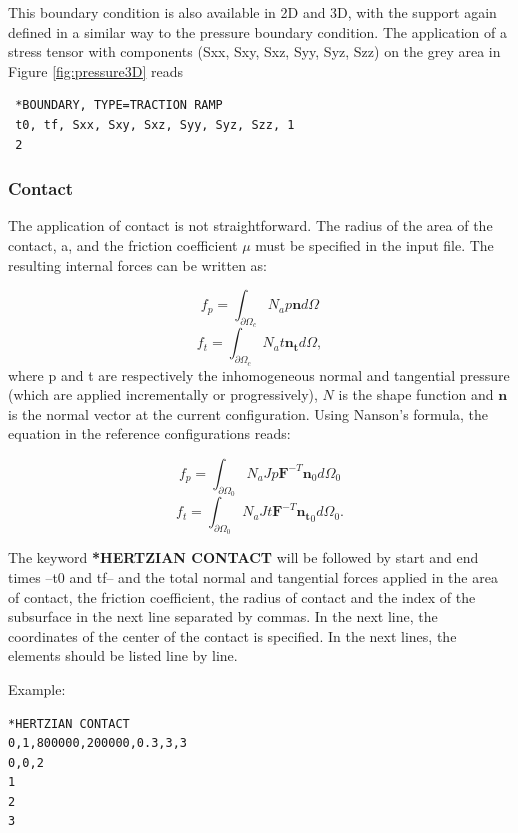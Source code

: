 \documentclass[oneside,11pt,times]{book}
\begin{document}
 This boundary condition is also available in 2D and 3D, with the support again defined in a similar way to the pressure boundary condition. The application of a stress tensor with components (Sxx, Sxy, Sxz, Syy, Syz, Szz) on the grey area in Figure \ref{fig:pressure3D} reads
 \begin{lstlisting}
 *BOUNDARY, TYPE=TRACTION RAMP
 t0, tf, Sxx, Sxy, Sxz, Syy, Syz, Szz, 1
 2
 \end{lstlisting}


 \subsubsection{Contact}

 The application of contact is not straightforward. The radius of the area of the contact, a, and the friction coefficient $\mu$ must be specified in the input file. The resulting internal forces can be written as:

 \begin{equation}
f_p=\int_{\partial\Omega_c}N_ap\mathbf{n}d\Omega
\end{equation}
 \begin{equation}
f_t=\int_{\partial\Omega_c}N_at\mathbf{n_{t}}d\Omega,
\end{equation}
where p and t are respectively the inhomogeneous normal and tangential pressure (which are applied incrementally or progressively), $N$ is the shape function and $\mathbf{n}$ is the normal vector at the current configuration. Using Nanson's formula, the equation in the reference configurations reads:

\begin{equation}
f_p=\int_{\partial\Omega_0}N_aJp\mathbf{F}^{-T}\mathbf{n}_0d\Omega_0
\end{equation}
\begin{equation}
f_t=\int_{\partial\Omega_0}N_aJt\mathbf{F}^{-T}\mathbf{n_{t}}_0d\Omega_0.
\end{equation}

The keyword \textbf{*HERTZIAN CONTACT} will be followed by start and end times --t0 and tf-- and the total normal and tangential forces applied in the area of contact, the friction coefficient, the radius of contact and the index of the subsurface in the next line separated by commas. In the next line, the coordinates of the center of the contact is specified. In the next lines, the elements should be listed line by line.

Example:
\begin{lstlisting}
*HERTZIAN CONTACT
0,1,800000,200000,0.3,3,3
0,0,2
1
2
3

\end{lstlisting}
\end{document}
